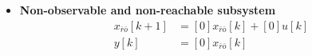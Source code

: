 \documentclass[twoside, 11pt, a4paper]{article}
\begin{document}
\begin{itemize}
\begin{align*}
        \\
        y[k] &= \left[ \begin{array}{c|c} 4 & 2 \end{array} \right] \begin{bmatrix} x_{ro}[k] \\ x_{\bar{r}o}[k] \end{bmatrix} 
    \end{align*}
    \item \textbf{Non-observable and non-reachable subsystem}
    \begin{align*}
        x_{\bar{r}\bar{o}}[k+1] &= [0] x_{\bar{r}\bar{o}}[k] + [0] u[k]
        \\
        y[k] &= [0] x_{\bar{r}\bar{o}}[k]
    \end{align*}
\end{itemize}

\end{document}
